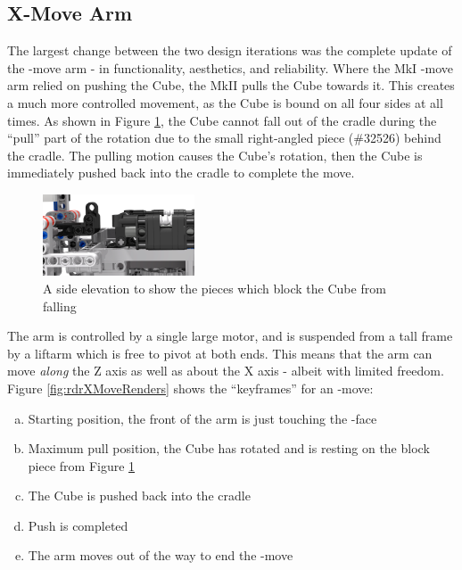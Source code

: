 \documentclass{report}
\newcommand{\tit}[1]{\textit{#1}}
\newcommand{\legopiece}[1]{(\##1)}
\newcommand{\face}[1]{\uppercase{\texttt{\formatmovesnospace{#1}}}-face}
\newcommand{\move}[1]{\uppercase{\texttt{\formatmovesnospace{#1}}}-move}
\begin{document}
	\subsection{X-Move Arm}
    
    The largest change between the two design iterations was the complete update of the \move{x} arm - in functionality, aesthetics, and reliability. Where the MkI \move{x} arm relied on pushing the Cube, the MkII pulls the Cube towards it. This creates a much more controlled movement, as the Cube is bound on all four sides at all times. As shown in Figure \ref{fig:rdrXMoveBlock}, the Cube cannot fall out of the cradle during the \enquote{pull} part of the rotation due to the small right-angled piece \legopiece{32526} behind the cradle. The pulling motion causes the Cube's rotation, then the Cube is immediately pushed back into the cradle to complete the move.
   	
	\begin{figure}[H]
		\centering
		\includegraphics[width=0.4\textwidth]{Resources/Images/rdrXMoveBlock.png}
		\caption{A side elevation to show the pieces which block the Cube from falling}
		\label{fig:rdrXMoveBlock}
   	\end{figure}
   
    The arm is controlled by a single large motor, and is suspended from a tall frame by a liftarm which is free to pivot at both ends. This means that the arm can move \tit{along} the Z axis as well as about the X axis - albeit with limited freedom. Figure \ref{fig:rdrXMoveRenders} shows the \enquote{keyframes} for an \move{x}: 
    
    \begin{enumerate}[a)]
    	\item Starting position, the front of the arm is just touching the \face{f}
    	\item Maximum pull position, the Cube has rotated and is resting on the block piece from Figure \ref{fig:rdrXMoveBlock}
    	\item The Cube is pushed back into the cradle
    	\item Push is completed
    	\item The arm moves out of the way to end the \move{x}
    \end{enumerate}
    
\end{document}
